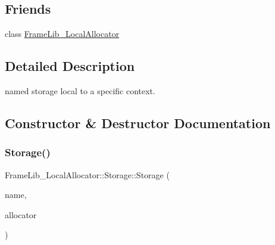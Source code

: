 \subsection*{Friends}
\begin{DoxyCompactItemize}
\item 
class \hyperlink{class_frame_lib___local_allocator_1_1_storage_ab38ae86a5b2f6f2e79c8b7ed2a9c8c20}{Frame\+Lib\+\_\+\+Local\+Allocator}
\end{DoxyCompactItemize}


\subsection{Detailed Description}
named storage local to a specific context. 

\subsection{Constructor \& Destructor Documentation}
\mbox{\label{class_frame_lib___local_allocator_1_1_storage_a51742c2b24393570cf3478d0ad7530f8}} 
\subsubsection{\texorpdfstring{Storage()}{Storage()}\hspace{0.1cm}{\footnotesize\ttfamily [1/2]}}
{\footnotesize\ttfamily Frame\+Lib\+\_\+\+Local\+Allocator\+::\+Storage\+::\+Storage (\begin{DoxyParamCaption}\item[{const char $\ast$}]{name,  }\item[{\hyperlink{class_frame_lib___local_allocator}{Frame\+Lib\+\_\+\+Local\+Allocator} $\ast$}]{allocator }\end{DoxyParamCaption})\hspace{0.3cm}{\ttfamily [protected]}}

\mbox{\label{class_frame_lib___local_allocator_1_1_storage_a562e98ee56a7fcff07f90621572688b1}} 
